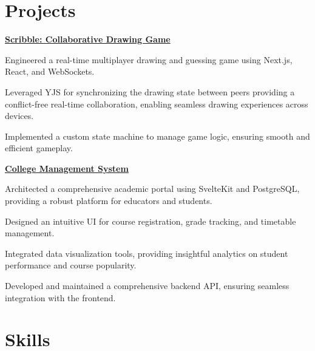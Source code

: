 \section{Projects}
\textbf{\href{https://github.com/elweday1/scribble}{Scribble: Collaborative Drawing Game}}
\vspace{0.10 cm}
\begin{onecolentry}
    \begin{highlights}
        \item Engineered a real-time multiplayer drawing and guessing game using Next.js, React, and WebSockets.
        \item Leveraged YJS for synchronizing the drawing state between peers providing a conflict-free real-time collaboration, enabling seamless drawing experiences across devices.
        \item Implemented a custom state machine to manage game logic, ensuring smooth and efficient gameplay.

    \end{highlights}
\end{onecolentry}


\vspace{0.2 cm}

\textbf{\href{https://github.com/elweday1/CollegeSite}{College Management System}}

\vspace{0.10 cm}
\begin{onecolentry}
    \begin{highlights}
        \item Architected a comprehensive academic portal using SvelteKit and PostgreSQL, providing a robust platform for educators and students.
        \item Designed an intuitive UI for course registration, grade tracking, and timetable management.
        \item Integrated data visualization tools, providing insightful analytics on student performance and course popularity.
        \item Developed and maintained a comprehensive backend API, ensuring seamless integration with the frontend.
    \end{highlights}
\end{onecolentry}


\section{Skills}


